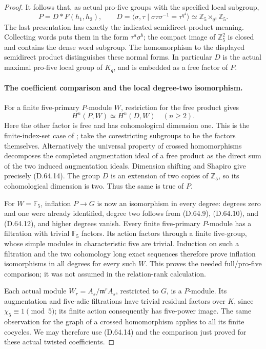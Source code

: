 \begin{proof}
It follows that, as actual pro-five groups with the
specified local subgroup,
\[
       P=D*F(h_1,h_2),\qquad
       D=\langle\sigma,\tau\mid
                  \sigma\tau\sigma^{-1}=\tau^{q^4}\rangle
                \simeq\mathbb Z_5\rtimes_{q^4}\mathbb Z_5.
                                                        \tag{D.64.13}
\]
The last presentation has exactly the indicated
semidirect-product meaning. Collecting words puts them
in the form \(\tau^a\sigma^b\); the compact image of
\(\mathbb Z_5^2\) is closed and contains the dense word
subgroup. The homomorphism to the displayed semidirect
product distinguishes these normal forms. In particular
\(D\) is the actual maximal pro-five local group of
\(K_q\), and is embedded as a free factor of \(P\).

\paragraph{The coefficient comparison and the local degree-two isomorphism.}
For a finite five-primary \(P\)-module \(W\), restriction
for the free product gives
\[
                 H^n(P,W)\simeq H^n(D,W)\quad(n\ge2).
                                                        \tag{D.64.14}
\]
Here the other factor is free and has cohomological
dimension one. This is the finite-index-set case of
\cite[Theorem 4.2]{DE_GaertnerWingberg}; take the
corestricting subgroups to be the factors themselves.
Alternatively the universal property of crossed
homomorphisms decomposes the completed augmentation
ideal of a free product as the direct sum of the two
induced augmentation ideals. Dimension shifting and
Shapiro give precisely (D.64.14). The group \(D\) is
an extension of two copies of \(\mathbb Z_5\), so its
cohomological dimension is two. Thus the same is true
of \(P\).

For \(W=\mathbb F_5\), inflation \(P\to G\) is now an
isomorphism in every degree: degrees zero and one were
already identified, degree two follows from (D.64.9),
(D.64.10), and (D.64.12), and higher degrees vanish.
Every finite five-primary \(P\)-module has a filtration
with trivial \(\mathbb F_5\) factors. Its action factors
through a finite five-group, whose simple modules in
characteristic five are trivial. Induction on such a
filtration and the two cohomology long exact sequences
therefore prove inflation isomorphisms in all degrees
for every such \(W\). This proves the needed full/pro-five
comparison; it was not assumed in the relation-rank
calculation.

Each actual module \(W_r=A_s/\mathfrak m^rA_s\), restricted
to \(G\), is a \(P\)-module. Its augmentation and
five-adic filtrations have trivial residual factors
over \(K\), since \(\chi_5\equiv1\pmod5\); its finite
action consequently has five-power image. The same
observation for the graph of a crossed homomorphism
applies to all its finite cocycles. We may therefore
use (D.64.14) and the comparison just proved for these
actual twisted coefficients.


\end{proof}
